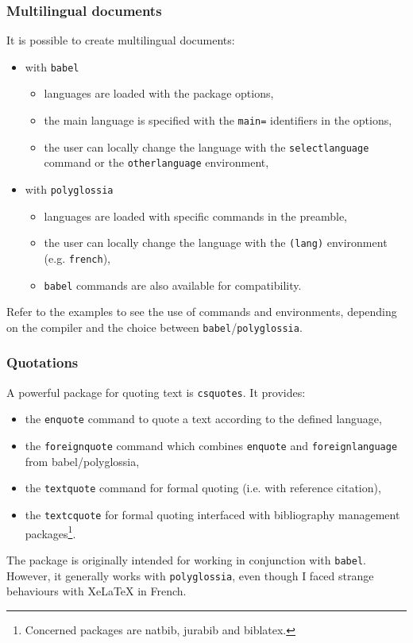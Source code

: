 \documentclass[11pt]{beamer}
\begin{document}
\begin{frame}
	\frametitle{Multilingual documents}
	
	It is possible to create multilingual documents:
	\begin{itemize}
		\item with \texttt{babel}
		\begin{itemize}
			\item languages are loaded with the package options,
			\item the main language is specified with the \texttt{main=} identifiers in the options,
			\item the user can locally change the language with the \texttt{selectlanguage} command or the \texttt{otherlanguage} environment,
		\end{itemize}
		\item with \texttt{polyglossia}
		\begin{itemize}
			\item languages are loaded with specific commands in the preamble,
			\item the user can locally change the language with the \texttt{(lang)} environment (e.g. \texttt{french}),
			\item \texttt{babel} commands are also available for compatibility.
		\end{itemize}
	\end{itemize}

	Refer to the examples to see the use of commands and environments, depending on the compiler and the choice between \texttt{babel}/\texttt{polyglossia}.
\end{frame}


\begin{frame}
	\frametitle{Quotations}
	
	A powerful package for quoting text is \texttt{csquotes}.
	It provides:
	\begin{itemize}
		\item the \texttt{enquote} command to quote a text according to the defined language,
		\item the \texttt{foreignquote} command which combines \texttt{enquote} and \texttt{foreignlanguage} from babel/polyglossia,
		\item the \texttt{textquote} command for formal quoting (i.e. with reference citation),
		\item the \texttt{textcquote} for formal quoting interfaced with bibliography management packages\footnote{Concerned packages are natbib, jurabib and biblatex.}.
	\end{itemize}

	The package is originally intended for working in conjunction with \texttt{babel}.
	However, it generally works with \texttt{polyglossia}, even though I faced strange behaviours with XeLaTeX in French.
\end{frame}
\end{document}
